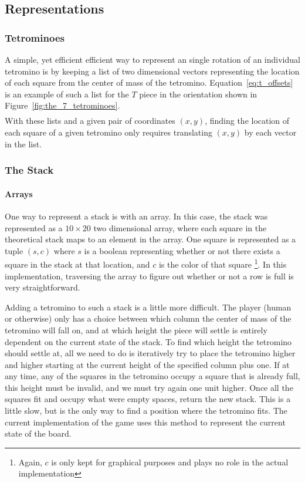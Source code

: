 \documentclass[fontsize=12pt]{article}
\begin{document}
\subsection{Representations}
\label{sub:representations}
\subsubsection{Tetrominoes}
\label{ssub:tetrominoes}

\par A simple, yet efficient efficient way to represent an single rotation of an individual tetromino is by keeping a list of two dimensional vectors representing the location of each square from the center of mass of the tetromino. Equation~\ref{eq:t_offsets} is an example of such a list for the $T$ piece in the orientation shown in Figure~\ref{fig:the_7_tetrominoes}.
\begin{align}
  [(0,0), (-1, 0), (0, 1), (1, 0)]\label{eq:t_offsets}
\end{align}
With these lists and a given pair of coordinates $(x,y)$, finding the location of each square of a given tetromino only requires translating $(x,y)$ by each vector in the list.

\subsubsection{The Stack}
\label{ssub:the_stack}
\paragraph{Arrays}
\label{par:arrays}
One way to represent a stack is with an array. In this case, the stack was represented as a $10\times 20$ two dimensional array, where each square in the theoretical stack maps to an element in the array. One square is represented as a tuple $(s,c)$ where $s$ is a boolean representing whether or not there exists a square in the stack at that location, and $c$ is the color of that square \footnote{Again, $c$ is only kept for graphical purposes and plays no role in the actual implementation}. In this implementation, traversing the array to figure out whether or not a row is full is very straightforward.
\par Adding a tetromino to such a stack is a little more difficult. The player (human or otherwise) only has a choice between which column the center of mass of the tetromino will fall on, and at which height the piece will settle is entirely dependent on the current state of the stack. To find which height the tetromino should settle at, all we need to do is iteratively try to place the tetromino higher and higher starting at the current height of the specified column plus one. If at any time, any of the squares in the tetromino occupy a square that is already full, this height must be invalid, and we must try again one unit higher. Once all the squares fit and occupy what were empty spaces, return the new stack. This is a little slow, but is the only way to find a position where the tetromino fits. The current implementation of the game uses this method to represent the current state of the board.
\end{document}
